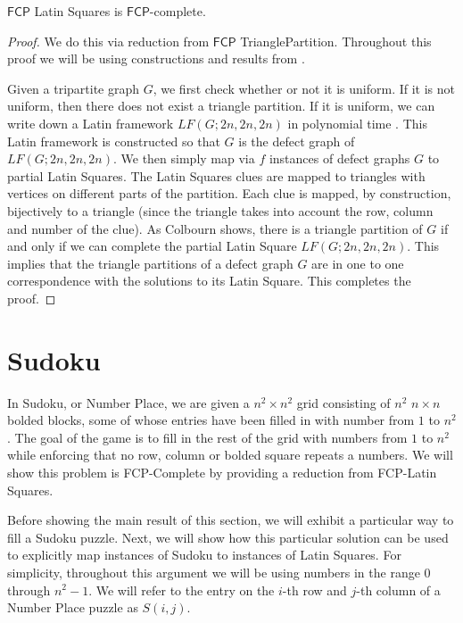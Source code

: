 \documentclass[runningheads,a4paper]{llncs}
\begin{document}
\begin{theorem}
$\mathsf{FCP}$ Latin Squares is $\mathsf{FCP}$-complete.
\end{theorem}

\begin{proof}
We do this via reduction from $\mathsf{FCP}$ TrianglePartition. Throughout this proof we will be using constructions and results from  \cite{colbourn1984complexity}.

Given a tripartite graph $G$, we first check whether or not it is uniform. If it is not uniform, then there does not exist a triangle partition. If it is uniform, we can write down a Latin framework $LF(G;2n,2n,2n)$ in polynomial time  \cite{colbourn1984complexity}. This Latin framework is constructed so that $G$ is the defect graph of $LF(G;2n,2n,2n)$. We then simply map via $f$ instances of defect graphs $G$ to partial Latin Squares. The Latin Squares clues are mapped to triangles with vertices on different parts of the partition. Each clue is mapped, by construction, bijectively to a triangle (since the triangle takes into account the row, column and number of the clue). As Colbourn shows, there is a triangle partition of $G$ if and only if we can complete the partial Latin Square $LF(G;2n,2n,2n)$. This implies that the triangle partitions of a defect graph $G$ are in one to one correspondence with the solutions to its Latin Square. This completes the proof. 

\end{proof}

\section{Sudoku}

In Sudoku, or Number Place, we are given a $n^2 \times n^2$ grid consisting of $n^2$ $n \times n$ bolded blocks, some of whose entries have been filled in with number from $1$ to $n^2$. The goal of the game is to fill in the rest of the grid with numbers from $1$ to $n^2$ while enforcing that no row, column or bolded square repeats a numbers. We will show this problem is FCP-Complete by providing a reduction from FCP-Latin Squares. 

Before showing the main result of this section, we will exhibit a particular way to fill a Sudoku puzzle. Next, we will show how this particular solution can be used to explicitly map instances of Sudoku to instances of Latin Squares. For simplicity, throughout this argument we will be using numbers in the range $0$ through $n^2 - 1$. We will refer to the entry on the $i$-th row and $j$-th column of a Number Place puzzle as $S(i,j)$.
\end{document}
